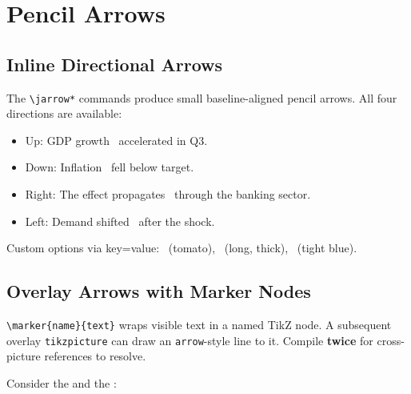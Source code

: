 \documentclass[11pt,a4paper]{article}
\begin{document}
\section{Pencil Arrows}

\subsection{Inline Directional Arrows}

The \verb|\jarrow*| commands produce small baseline-aligned pencil arrows. All four directions are available:

\begin{itemize}
    \item Up:    GDP growth \jarrowup\ accelerated in Q3.
    \item Down:  Inflation \jarrowdown\ fell below target.
    \item Right: The effect propagates \jarrowright\ through the banking sector.
    \item Left:  Demand shifted \jarrowleft\ after the shock.
\end{itemize}

Custom options via key=value: \jarrowup[color=tomato]\ (tomato), \jarrowr[len=0.6cm,lw=0.1cm]\ (long, thick), \jarrowd[color=note,pad=0.1em]\ (tight blue).

\subsection{Overlay Arrows with Marker Nodes}

\verb|\marker{name}{text}| wraps visible text in a named TikZ node. A subsequent overlay \texttt{tikzpicture} can draw an \texttt{arrow}-style line to it. Compile \textbf{twice} for cross-picture references to resolve.

Consider the  and the :
\vspace{1.5cm}
\end{document}
